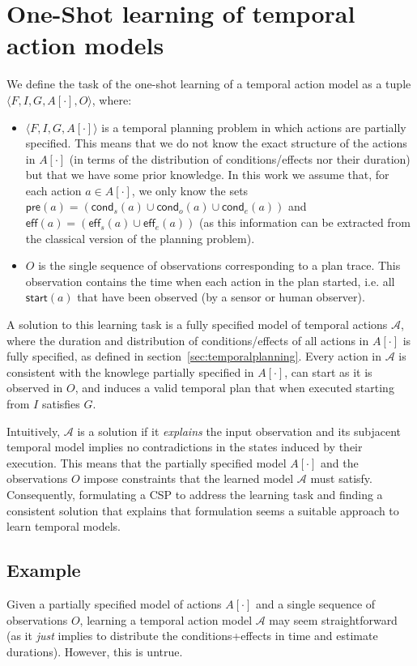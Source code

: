 \documentclass[runningheads]{llncs}
\newcommand{\tup}[1]{{\langle #1 \rangle}}
\newcommand{\pre}{\mathsf{pre}}    %
\newcommand{\eff}{\mathsf{eff}}    %
\newcommand{\cond}{\mathsf{cond}}  %
\newcommand{\start}{\mathsf{start}}%
\begin{document}
\section{One-Shot learning of temporal action models}
  \label{sec:learningtask}
  We define the task of the one-shot learning of a temporal action model as a tuple $\tup{F,I,G,A[\cdot],O}$, where:
  \begin{itemize}
  \item $\tup{F,I,G,A[\cdot]}$ is a temporal planning problem in which actions are partially specified.  This means that we do not know the exact structure of the actions in $A[\cdot]$ (in terms of the distribution of conditions/effects nor their duration) but that we have some prior knowledge. In this work we assume that, for each action $a \in A[\cdot]$, we only know the sets $\pre(a)=(\cond_s(a) \cup \cond_o(a) \cup \cond_e(a))$ and $\eff(a)=(\eff_s(a) \cup \eff_e(a))$ (as this information can be extracted from the classical version of the planning problem). 
  \item $O$ is the single sequence of observations corresponding to a plan trace. This observation contains the time when each action in the plan started, i.e. all $\start(a)$ that have been observed (by a sensor or human observer).    
  \end{itemize}    

  A solution to this learning task is a fully specified model of temporal actions $\mathcal{A}$, where the duration and distribution of conditions/effects of all actions in $A[\cdot]$ is fully specified, as defined in section~\ref{sec:temporalplanning}. Every action in $\mathcal{A}$ is consistent with the knowlege partially specified in $A[\cdot]$, can start as it is observed in $O$, and induces a valid temporal plan that when executed starting from $I$ satisfies $G$.

Intuitively, $\mathcal{A}$ is a solution if it {\em explains} the input observation and its subjacent temporal model implies no contradictions in the states induced by their execution. This means that the partially specified model $A[\cdot]$ and the observations $O$ impose constraints that the learned model $\mathcal{A}$ must satisfy. Consequently, formulating a CSP to address the learning task and finding a consistent solution that explains that formulation seems a suitable approach to learn temporal models.  
  
  
\subsection{Example}
  \label{sec:simpleTask}
Given a partially specified model of actions $A[\cdot]$ and a single sequence of observations $O$, learning a temporal action model $\mathcal{A}$ may seem straightforward (as it \emph{just} implies to distribute the conditions+effects in time and estimate durations). However, this is untrue.
\end{document}
